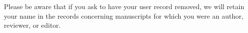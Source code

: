 \documentclass[a4paper]{article}
\begin{document}
Please be aware that if you ask to have your user record removed, we will retain your name in the records concerning manuscripts for which you were an author, reviewer, or editor.

 

\end{document}
